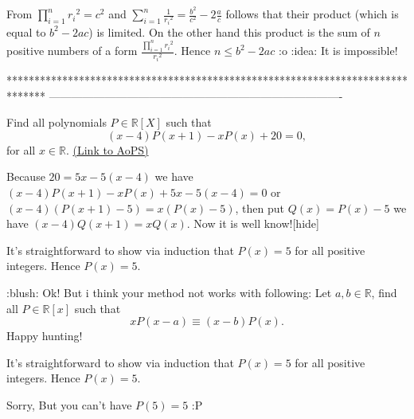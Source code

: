 \begin{solution}
	From $\prod_{i=1}^{n}{r_{i}}^{2}=c^{2}$ and $\sum_{i=1}^{n}\frac{1}{{r_{i}}^{2}}=\frac{b^{2}}{c^{2}}-2\frac{a}{c}$ follows that their product (which is equal to $b^{2}-2ac$) is limited. On the other hand this product is the sum of $n$ positive numbers of a form $\frac{\prod_{i=1}^{n}{r_{i}}^{2}}{{r_{i}}^{2}}$. Hence $n\leq b^{2}-2ac$  :o  :idea: It is impossible!
\end{solution}
*******************************************************************************
-------------------------------------------------------------------------------

\begin{problem}
	Find all polynomials $P \in \mathbb{R}[X]$ such that 
\[(x-4)P(x+1)-xP(x)+20=0,\]
for all $x \in \mathbb R$.
	\flushright \href{https://artofproblemsolving.com/community/c6h149112}{(Link to AoPS)}
\end{problem}



\begin{solution}Because $20=5x-5(x-4)$ we have $(x-4)P(x+1)-xP(x)+5x-5(x-4)=0$ or $(x-4)(P(x+1)-5)=x(P(x)-5)$, then put $Q(x)=P(x)-5$ we have $(x-4)Q(x+1)=xQ(x)$. Now it is well know![\/hide]
\end{solution}



\begin{solution}
	It's straightforward to show via induction that $P(x) = 5$ for all positive integers. Hence $P(x)=5$.
\end{solution}



\begin{solution}
	:blush:  Ok! But i think your method not works with following:
Let $a,b\in\mathbb{R}$, find all $P\in\mathbb{R}[x]$ such that \[xP(x-a)\equiv (x-b)P(x).\]
Happy hunting!  
\end{solution}



\begin{solution}
	\begin{tcolorbox}It's straightforward to show via induction that $P(x) = 5$ for all positive integers. Hence $P(x)=5$.\end{tcolorbox}
Sorry, But you can't have $P(5)=5$ :P
\end{solution}



